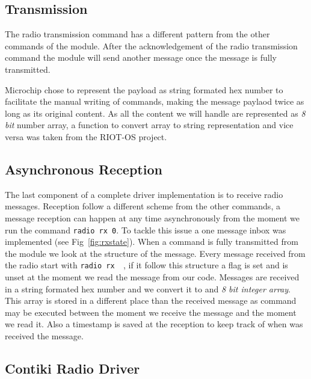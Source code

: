 

\subsection{Transmission}

The radio transmission command has a different pattern from the other commands 
of the module. After the acknowledgement of the radio transmission 
command the module will send another message once the message is fully
transmitted.



Microchip chose to represent the payload as string formated hex number to
facilitate the manual writing of commands, making the message paylaod twice as
long as its original content. As all the content we will handle 
are represented as \emph{8 bit} number array, a function to convert array to
string representation and vice versa was taken from the RIOT-OS project.

\subsection{Asynchronous Reception}

The last component of a complete driver implementation is to receive radio
messages.
Reception follow a different scheme from the other commands, a message
reception can happen at any time asynchronously from the moment we run the
command \lstinline{radio rx 0}.
To tackle this issue a one message inbox was implemented (see
Fig~\ref{fig:rxstate}).
When a command is fully transmitted from the module we look at the structure of
the message. Every message received from the radio start with \lstinline{radio rx  }, if it follow this structure a flag is set and is unset at the moment we
read the message from our code.
Messages are received in a string formated hex number and we convert it to and \emph{8
bit integer array}. This array is stored in a different place than the received
message as command may be executed between the moment we receive the message and
the moment we read it.
Also a timestamp is saved at the reception to keep track of when was received the
message.



\subsection{Contiki Radio Driver}


